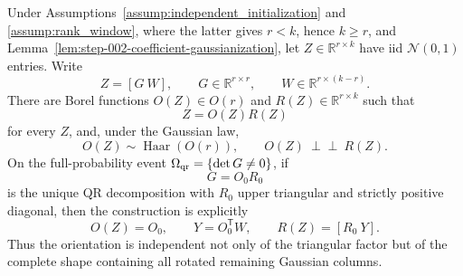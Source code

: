 \begin{lemma}
\label{lem:step-006-gaussian-qr-shape}
Under Assumptions~\ref{assump:independent_initialization} and
\ref{assump:rank_window}, where the latter gives \(r<k\), hence \(k\ge r\),
and Lemma~\ref{lem:step-002-coefficient-gaussianization}, let
\(Z\in\mathbb R^{r\times k}\) have iid \(\mathcal N(0,1)\) entries. Write
\[
  Z=[G\ W],\qquad G\in\mathbb R^{r\times r},
  \qquad W\in\mathbb R^{r\times(k-r)}.
\]
There are Borel functions \(O(Z)\in O(r)\) and
\(R(Z)\in\mathbb R^{r\times k}\) such that
\begin{equation}
  Z=O(Z)R(Z)                                                   \label{eq:step-006-2}
\end{equation}
for every \(Z\), and, under the Gaussian law,
\begin{equation}
  O(Z)\sim\operatorname{Haar}(O(r)),
  \qquad O(Z)\ \perp\!\!\!\perp\ R(Z).                       \label{eq:step-006-3}
\end{equation}
On the full-probability event \(\Omega_{\rm qr}=\{\det G\ne0\}\), if
\[
  G=O_0R_0
\]
is the unique QR decomposition with \(R_0\) upper triangular and strictly
positive diagonal, then the construction is explicitly
\begin{equation}
  O(Z)=O_0,\qquad
  Y=O_0^{\mathsf T}W,\qquad
  R(Z)=[R_0\ Y].                                               \label{eq:step-006-4}
\end{equation}
Thus the orientation is independent not only of the triangular factor but of
the complete shape containing all rotated remaining Gaussian columns.

\end{lemma}

